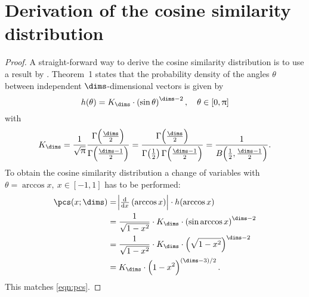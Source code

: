 \chapter{Derivation of the cosine similarity distribution}\label{apdx:cosine-sim}
\begin{proof}
A straight-forward way to derive the cosine similarity distribution is to use a result by \textcite{cai2013}.
Theorem~1 states that the probability density of the angles $\theta$ between independent $\dims$-dimensional vectors is given by
\begin{equation}
    h(\theta) = K_{\dims} \cdot \del{\sin \theta}^{\dims - 2},\quad \theta \in \sbr{0, \uppi}
\end{equation}
with
\begin{equation}
    K_{\dims} = \frac{1}{\sqrt{\uppi}} \frac{\Gamma\!\del{\frac{\dims}{2}}}{\Gamma\!\del{\frac{\dims - 1}{2}}} = \frac{\Gamma\!\del{\frac{\dims}{2}}}{\Gamma\!\del{\frac{1}{2}} \Gamma\!\del{\frac{\dims - 1}{2}}} = \frac{1}{B\!\del{\frac{1}{2}, \frac{\dims -1}{2}}} \text{.}
\end{equation}
To obtain the cosine similarity distribution a change of variables with $\theta = \arccos x,\ x \in [-1, 1]$ has to be performed:
\begin{align}
    \pcs(x; \dims) &= \abs{\od{}{x} \del{\arccos x}} \cdot h(\arccos x) \\
    &= \frac{1}{\sqrt{1 - x^2}} \cdot K_{\dims} \cdot \del{\sin \arccos x}^{\dims - 2} \\
    &= \frac{1}{\sqrt{1 - x^2}} \cdot K_{\dims} \cdot \del{\sqrt{1 - x^2}}^{\dims - 2} \\
    &= K_{\dims} \cdot \del{1 - x^2}^{\del{\dims - 3}/2} \text{.}
\end{align}
This matches \cref{eqn:pcs}.
\end{proof}

